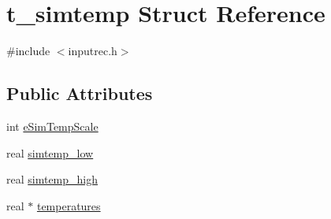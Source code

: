 \hypertarget{structt__simtemp}{\section{t\-\_\-simtemp \-Struct \-Reference}
\label{structt__simtemp}
}


{\ttfamily \#include $<$inputrec.\-h$>$}

\subsection*{\-Public \-Attributes}
\begin{DoxyCompactItemize}
\item 
int \hyperlink{structt__simtemp_a9a1aa21b2abfcc6af26a3b9b90dd6088}{e\-Sim\-Temp\-Scale}
\item 
real \hyperlink{structt__simtemp_ad923b0f345f2b823ed15c508897a4a14}{simtemp\-\_\-low}
\item 
real \hyperlink{structt__simtemp_acaa1ef151aec695d7df9d00a9b962a42}{simtemp\-\_\-high}
\item 
real $\ast$ \hyperlink{structt__simtemp_a52387e0784ed448508c96e542b1d07b0}{temperatures}
\end{DoxyCompactItemize}


